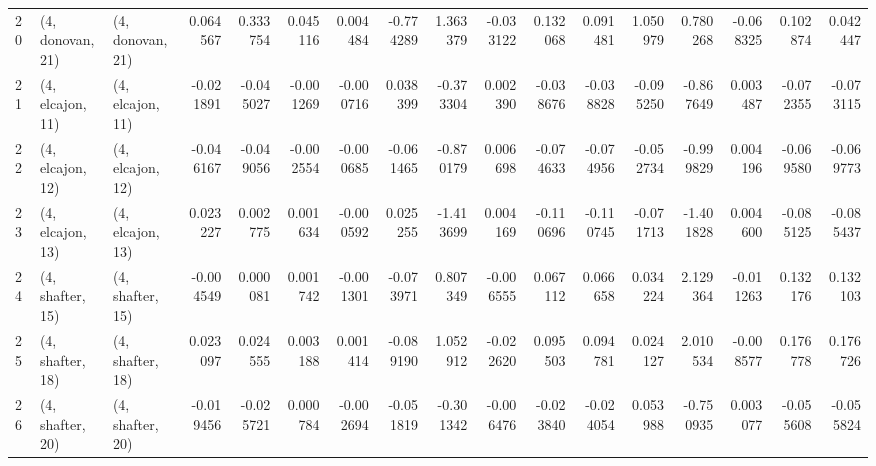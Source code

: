 \begin{tabular}{lllrrrrrrrrrrrrrr}
20 &  (4, donovan, 21) &  (4, donovan, 21) &  0.064567 &  0.333754 &   0.045116 &  0.004484 & -0.774289 &   1.363379 & -0.033122 &   0.132068 &  0.091481 &  1.050979 &  0.780268 & -0.068325 &  0.102874 &  0.042447 \\
21 &  (4, elcajon, 11) &  (4, elcajon, 11) & -0.021891 & -0.045027 &  -0.001269 & -0.000716 &  0.038399 &  -0.373304 &  0.002390 &  -0.038676 & -0.038828 & -0.095250 & -0.867649 &  0.003487 & -0.072355 & -0.073115 \\
22 &  (4, elcajon, 12) &  (4, elcajon, 12) & -0.046167 & -0.049056 &  -0.002554 & -0.000685 & -0.061465 &  -0.870179 &  0.006698 &  -0.074633 & -0.074956 & -0.052734 & -0.999829 &  0.004196 & -0.069580 & -0.069773 \\
23 &  (4, elcajon, 13) &  (4, elcajon, 13) &  0.023227 &  0.002775 &   0.001634 & -0.000592 &  0.025255 &  -1.413699 &  0.004169 &  -0.110696 & -0.110745 & -0.071713 & -1.401828 &  0.004600 & -0.085125 & -0.085437 \\
24 &  (4, shafter, 15) &  (4, shafter, 15) & -0.004549 &  0.000081 &   0.001742 & -0.001301 & -0.073971 &   0.807349 & -0.006555 &   0.067112 &  0.066658 &  0.034224 &  2.129364 & -0.011263 &  0.132176 &  0.132103 \\
25 &  (4, shafter, 18) &  (4, shafter, 18) &  0.023097 &  0.024555 &   0.003188 &  0.001414 & -0.089190 &   1.052912 & -0.022620 &   0.095503 &  0.094781 &  0.024127 &  2.010534 & -0.008577 &  0.176778 &  0.176726 \\
26 &  (4, shafter, 20) &  (4, shafter, 20) & -0.019456 & -0.025721 &   0.000784 & -0.002694 & -0.051819 &  -0.301342 & -0.006476 &  -0.023840 & -0.024054 &  0.053988 & -0.750935 &  0.003077 & -0.055608 & -0.055824 \\
\bottomrule
\end{tabular}
